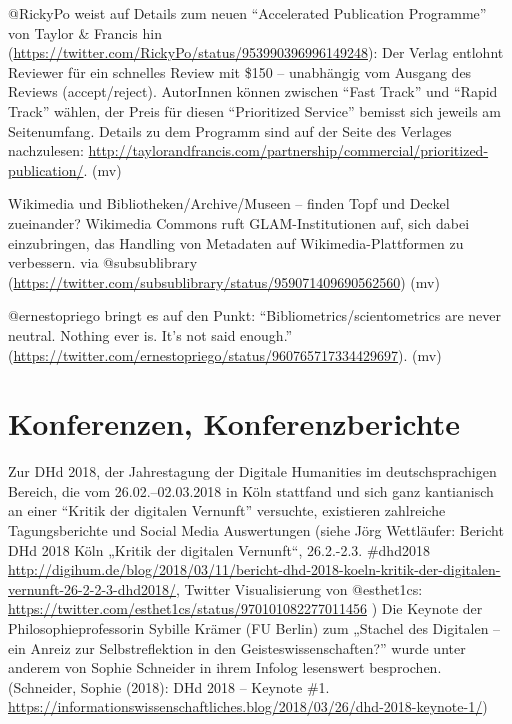 \documentclass[a4paper,
fontsize=11pt,
oneside,
numbers=noperiodatend,
parskip=half-,
bibliography=totoc,
final
]{scrartcl}
\begin{document}
@RickyPo weist auf Details zum neuen \enquote{Accelerated Publication
Programme} von Taylor \& Francis hin
(\url{https://twitter.com/RickyPo/status/953990396996149248}): Der
Verlag entlohnt Reviewer für ein schnelles Review mit \$150 --
unabhängig vom Ausgang des Reviews (accept/reject). AutorInnen können
zwischen \enquote{Fast Track} und \enquote{Rapid Track} wählen, der
Preis für diesen \enquote{Prioritized Service} bemisst sich jeweils am
Seitenumfang. Details zu dem Programm sind auf der Seite des Verlages
nachzulesen:
\url{http://taylorandfrancis.com/partnership/commercial/prioritized-publication/}.
(mv)

Wikimedia und Bibliotheken/Archive/Museen -- finden Topf und Deckel
zueinander? Wikimedia Commons ruft GLAM-Institutionen auf, sich dabei
einzubringen, das Handling von Metadaten auf Wikimedia-Plattformen zu
verbessern. via @subsublibrary
(\url{https://twitter.com/subsublibrary/status/959071409690562560}) (mv)

@ernestopriego bringt es auf den Punkt:
\enquote{Bibliometrics/scientometrics are never neutral. Nothing ever
is. It's not said enough.}
(\url{https://twitter.com/ernestopriego/status/960765717334429697}).
(mv)

\hypertarget{konferenzen-konferenzberichte}{%
\section{Konferenzen,
Konferenzberichte}\label{konferenzen-konferenzberichte}}

Zur DHd 2018, der Jahrestagung der Digitale Humanities im
deutschsprachigen Bereich, die vom 26.02.--02.03.2018 in Köln stattfand
und sich ganz kantianisch an einer \enquote{Kritik der digitalen
Vernunft} versuchte, existieren zahlreiche Tagungsberichte und Social
Media Auswertungen (siehe Jörg Wettläufer: Bericht DHd 2018 Köln „Kritik
der digitalen Vernunft\enquote{, 26.2.-2.3. \#dhd2018
\url{http://digihum.de/blog/2018/03/11/bericht-dhd-2018-koeln-kritik-der-digitalen-vernunft-26-2-2-3-dhd2018/},
Twitter Visualisierung von @esthet1cs:
\url{https://twitter.com/esthet1cs/status/970101082277011456} ) Die
Keynote der Philosophieprofessorin Sybille Krämer (FU Berlin) zum
„Stachel des Digitalen -- ein Anreiz zur Selbstreflektion in den
Geisteswissenschaften?} wurde unter anderem von Sophie Schneider in
ihrem Infolog lesenswert besprochen. (Schneider, Sophie (2018): DHd 2018
-- Keynote \#1.
\url{https://informationswissenschaftliches.blog/2018/03/26/dhd-2018-keynote-1/})
\end{document}
